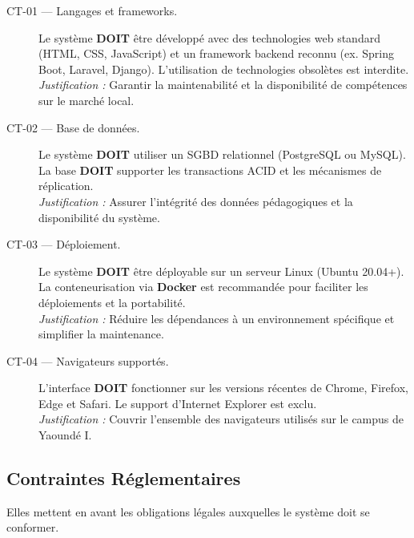 \begin{description}

    \item[CT-01 — Langages et frameworks.]
    Le système \textbf{DOIT} être développé avec des technologies web
    standard (HTML, CSS, JavaScript) et un framework backend reconnu
    (ex. Spring Boot, Laravel, Django). L'utilisation de technologies
    obsolètes est interdite.\\
    \textit{Justification :} Garantir la maintenabilité et la disponibilité
    de compétences sur le marché local.

    \item[CT-02 — Base de données.]
    Le système \textbf{DOIT} utiliser un SGBD relationnel
    (PostgreSQL ou MySQL). La base \textbf{DOIT} supporter les transactions
    ACID et les mécanismes de réplication.\\
    \textit{Justification :} Assurer l'intégrité des données pédagogiques
    et la disponibilité du système.

    \item[CT-03 — Déploiement.]
    Le système \textbf{DOIT} être déployable sur un serveur Linux
    (Ubuntu 20.04+). La conteneurisation via \textbf{Docker} est recommandée
    pour faciliter les déploiements et la portabilité.\\
    \textit{Justification :} Réduire les dépendances à un environnement
    spécifique et simplifier la maintenance.

    \item[CT-04 — Navigateurs supportés.]
    L'interface \textbf{DOIT} fonctionner sur les versions récentes de
    Chrome, Firefox, Edge et Safari. Le support d'Internet Explorer
    est exclu.\\
    \textit{Justification :} Couvrir l'ensemble des navigateurs utilisés
    sur le campus de Yaoundé I.

\end{description}

\subsection{Contraintes Réglementaires}
Elles mettent en avant les obligations légales
auxquelles le système doit se conformer.

